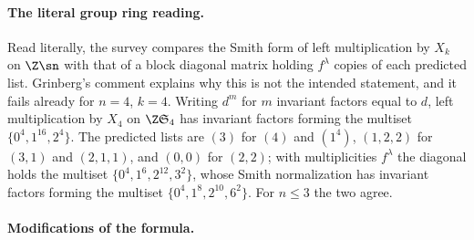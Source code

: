\paragraph{The literal group ring reading.} Read literally, the survey
compares the Smith form of left multiplication by $X_k$ on $\Z\sn$ with that
of a block diagonal matrix holding $f^\lambda$ copies of each predicted list.
Grinberg's comment explains why this is not the intended statement, and it
fails already for $n=4$, $k=4$. Writing $d^m$ for $m$ invariant factors equal
to $d$, left multiplication by $X_4$ on $\Z\mathfrak{S}_4$ has invariant factors
forming the multiset $\{0^4,1^{16},2^4\}$. The predicted lists are $(3)$ for $(4)$ and $(1^4)$,
$(1,2,2)$ for $(3,1)$ and $(2,1,1)$, and $(0,0)$ for $(2,2)$; with
multiplicities $f^\lambda$ the diagonal holds the multiset
$\{0^4,1^6,2^{12},3^2\}$, whose Smith normalization has invariant factors
forming the multiset $\{0^4,1^8,2^{10},6^2\}$. For $n\le3$ the two agree.

\paragraph{Modifications of the formula.}\label{sec:corrected}

